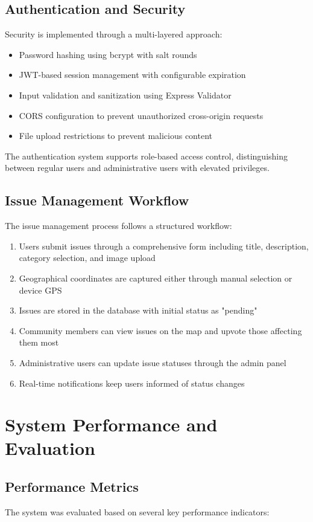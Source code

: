 \documentclass[journal,10pt,twocolumn]{IEEEtran}
\begin{document}
\subsection{Authentication and Security}
Security is implemented through a multi-layered approach:

\begin{itemize}
\item Password hashing using bcrypt with salt rounds
\item JWT-based session management with configurable expiration
\item Input validation and sanitization using Express Validator
\item CORS configuration to prevent unauthorized cross-origin requests
\item File upload restrictions to prevent malicious content
\end{itemize}

The authentication system supports role-based access control, distinguishing between regular users and administrative users with elevated privileges.

\subsection{Issue Management Workflow}
The issue management process follows a structured workflow:

\begin{enumerate}
\item Users submit issues through a comprehensive form including title, description, category selection, and image upload
\item Geographical coordinates are captured either through manual selection or device GPS
\item Issues are stored in the database with initial status as "pending"
\item Community members can view issues on the map and upvote those affecting them most
\item Administrative users can update issue statuses through the admin panel
\item Real-time notifications keep users informed of status changes
\end{enumerate}

\section{System Performance and Evaluation}
\subsection{Performance Metrics}
The system was evaluated based on several key performance indicators:
\end{document}
